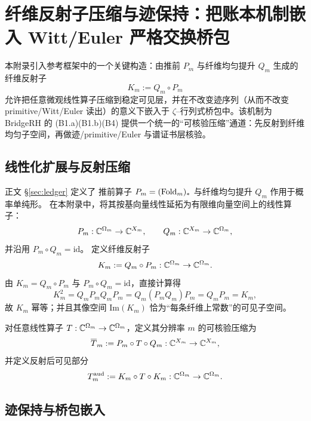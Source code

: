 \section{纤维反射子压缩与迹保持：把账本机制嵌入 Witt/Euler 严格交换桥包}\label{app:reflector-witt-bridge}

本附录引入参考框架中的一个关键构造：由推前 $P_m$ 与纤维均匀提升 $Q_m$ 生成的纤维反射子
$$
K_m:=Q_m\circ P_m
$$
允许把任意微观线性算子压缩到稳定可见层，并在不改变迹序列（从而不改变 primitive/Witt/Euler 读出）的意义下嵌入于 $\zeta$–行列式桥包中。该机制为 BridgeRH 的 (B1.a)(B1.b)(B4) 提供一个统一的“可核验压缩”通道：先反射到纤维均匀子空间，再做迹/primitive/Euler 与谱证书层核验。

\subsection{线性化扩展与反射压缩}\label{subsec:reflector-setup}
正文 \S\ref{sec:ledger} 定义了
推前算子 $P_m=(\mathrm{Fold}_m)_*$ 与纤维均匀提升 $Q_m$ 作用于概率单纯形。
在本附录中，将其按基向量线性延拓为有限维向量空间上的线性算子：
$$
P_m:\mathbb{C}^{\Omega_m}\to \mathbb{C}^{X_m},\qquad
Q_m:\mathbb{C}^{X_m}\to \mathbb{C}^{\Omega_m},
$$
并沿用 $P_m\circ Q_m=\mathrm{id}$。
定义纤维反射子
$$
K_m:=Q_m\circ P_m:\mathbb{C}^{\Omega_m}\to \mathbb{C}^{\Omega_m}.
$$
由 $K_m=Q_m\circ P_m$ 与 $P_m\circ Q_m=\mathrm{id}$，直接计算得
$$
K_m^2=Q_mP_mQ_mP_m=Q_m(P_mQ_m)P_m=Q_mP_m=K_m,
$$
故 $K_m$ 幂等；并且其像空间 $\mathrm{Im}(K_m)$ 恰为“每条纤维上常数”的可见子空间。

\begin{definition}[可核验压缩与反射后可见部分]\label{def:reflector-compression}
对任意线性算子 $T:\mathbb{C}^{\Omega_m}\to\mathbb{C}^{\Omega_m}$，定义其分辨率 $m$ 的可核验压缩为
$$
\overline T_m:=P_m\circ T\circ Q_m:\mathbb{C}^{X_m}\to\mathbb{C}^{X_m},
$$
并定义反射后可见部分
$$
T_m^{\mathrm{aud}}:=K_m\circ T\circ K_m:\mathbb{C}^{\Omega_m}\to\mathbb{C}^{\Omega_m}.
$$
\end{definition}

\subsection{迹保持与桥包嵌入}\label{subsec:trace-preservation}


